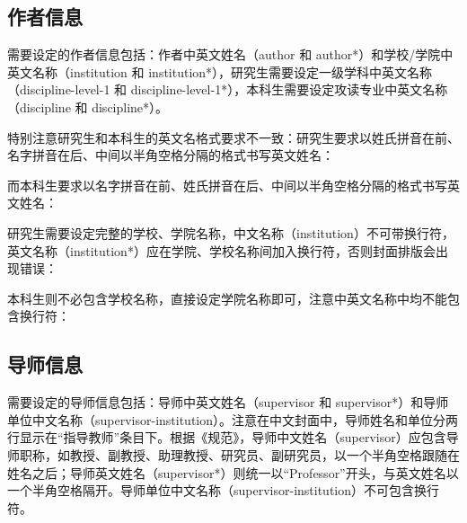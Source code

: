 \documentclass[master]{shtthesis}
\begin{document}
\subsection{作者信息}
需要设定的作者信息包括：作者中英文姓名（author 和 author*）和学校/学院中英文名称（institution 和 institution*），研究生需要设定一级学科中英文名称（discipline-level-1 和 discipline-level-1*），本科生需要设定攻读专业中英文名称（discipline 和 discipline*）。

特别注意研究生和本科生的英文名格式要求不一致：研究生要求以姓氏拼音在前、名字拼音在后、中间以半角空格分隔的格式书写英文姓名：
\begin{latex}
\end{latex}
而本科生要求以名字拼音在前、姓氏拼音在后、中间以半角空格分隔的格式书写英文姓名：
\begin{latex}
\end{latex}

研究生需要设定完整的学校、学院名称，中文名称（institution）不可带换行符，英文名称（institution*）应在学院、学校名称间加入换行符，否则封面排版会出现错误：
\begin{latex}
\end{latex}
本科生则不必包含学校名称，直接设定学院名称即可，注意中英文名称中均不能包含换行符：
\begin{latex}
\end{latex}

\subsection{导师信息}
需要设定的导师信息包括：导师中英文姓名（supervisor 和 supervisor*）和导师单位中文名称（supervisor-institution）。注意在中文封面中，导师姓名和单位分两行显示在“指导教师”条目下。根据《规范》，导师中文姓名（supervisor）应包含导师职称，如教授、副教授、助理教授、研究员、副研究员，以一个半角空格跟随在姓名之后；导师英文姓名（supervisor*）则统一以“Professor”开头，与英文姓名以一个半角空格隔开。导师单位中文名称（supervisor-institution）不可包含换行符。
\begin{latex}
\end{latex}
\end{document}
